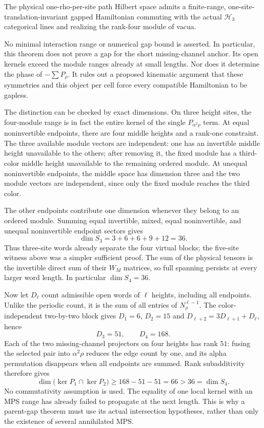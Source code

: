 \begin{theorem}
The physical one-rho-per-site path Hilbert space admits a finite-range,
one-site-translation-invariant gapped Hamiltonian commuting with the
actual $\mathcal H_3$ categorical lines and realizing the rank-four module
of vacua.
\end{theorem}

No minimal interaction range or numerical gap bound is asserted.
In particular, this theorem does not prove a gap for the short
missing-channel anchor. Its open kernels exceed the module ranges
already at small lengths. Nor does it determine the phase of
$-\sum P_\rho$. It rules out a proposed kinematic argument that
these symmetries and this object per cell force every compatible
Hamiltonian to be gapless.

\begin{example}
The distinction can be checked by exact dimensions. On three height
sites, the four-module range is in fact the entire kernel of the
single $P_{\alpha^2\rho}$ term. At equal noninvertible endpoints,
there are four middle heights and a rank-one constraint. The three
available module vectors are independent: one has an invertible
middle height unavailable to the others; after removing it, the
fixed module has a third-color middle height unavailable to the
remaining ordered module. At unequal noninvertible endpoints, the
middle space has dimension three and the two module vectors are
independent, since only the fixed module reaches the third color.

The other endpoints contribute one dimension whenever they belong
to an ordered module. Summing equal invertible, mixed, equal
noninvertible, and unequal noninvertible endpoint sectors gives
\[
 \dim S_3=3+6+6+9+12=36.
\]
Thus three-site words already separate the four virtual blocks;
the five-site witness above was a simpler sufficient proof. The
sum of the physical tensors is the invertible direct sum of their
$W_M$ matrices, so full spanning persists at every larger word
length. In particular $\dim S_4=36$.

Now let $D_\ell$ count admissible open words of $\ell$ heights,
including all endpoints. Unlike the periodic count, it is the sum
of all entries of $N_\rho^{\ell-1}$. The color-independent
two-by-two block gives $D_1=6$, $D_2=15$ and
$D_{\ell+2}=3D_{\ell+1}+D_\ell$, hence
\[
 D_3=51,\qquad D_4=168.
\]
Each of the two missing-channel projectors on four heights has
rank $51$: fusing the selected pair into $\alpha^2\rho$ reduces
the edge count by one, and its alpha permutation disappears when
all endpoints are summed. Rank subadditivity therefore gives
\[
 \dim\bigl(\ker P_1\cap\ker P_2\bigr)
 \geq168-51-51=66>36=\dim S_4.
\]
No commutativity assumption is used. The equality of one local
kernel with an MPS range has already failed to propagate at the
next length. This is why a parent-gap theorem must use its actual
intersection hypotheses, rather than only the existence of several
annihilated MPS.
\end{example}

